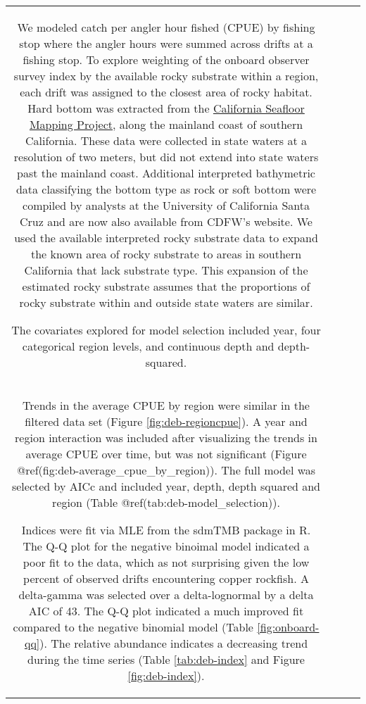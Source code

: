 \documentclass[11pt,
  letterpaper,
]{article}
\begin{document}
\begin{longtable}[t]{c>{\centering\arraybackslash}p{2cm}>{\centering\arraybackslash}p{2cm}>{\centering\arraybackslash}p{2cm}}
We modeled catch per angler hour fished (CPUE) by fishing stop where the angler hours were summed across drifts at a fishing stop. To explore weighting of the onboard observer survey index by the available rocky substrate within a region, each drift was assigned to the closest area of rocky habitat. Hard bottom was extracted from the \href{http://seafloor.otterlabs.org/index.html}{California Seafloor Mapping Project}, along the mainland coast of southern California. These data were collected in state waters at a resolution of two meters, but did not extend into state waters past the mainland coast. Additional interpreted bathymetric data classifying the bottom type as rock or soft bottom were compiled by analysts at the University of California Santa Cruz and are now also available from CDFW's website. We used the available interpreted rocky substrate data to expand the known area of rocky substrate to areas in southern California that lack substrate type. This expansion of the estimated rocky substrate assumes that the proportions of rocky substrate within and outside state waters are similar.

The covariates explored for model selection included year, four categorical region levels, and continuous depth and depth-squared.\\
Trends in the average CPUE by region were similar in the filtered data set (Figure \ref{fig:deb-regioncpue}). A year and region interaction was included after visualizing the trends in average CPUE over time, but was not significant (Figure @ref(fig:deb-average\_cpue\_by\_region)). The full model was selected by AICc and included year, depth, depth squared and region (Table @ref(tab:deb-model\_selection)).

Indices were fit via MLE from the sdmTMB package in R. The Q-Q plot for the negative binoimal model indicated a poor fit to the data, which as not surprising given the low percent of observed drifts encountering copper rockfish. A delta-gamma was selected over a delta-lognormal by a delta AIC of 43. The Q-Q plot indicated a much improved fit compared to the negative binomial model (Table \ref{fig:onboard-qq}). The relative abundance indicates a decreasing trend during the time series (Table \ref{tab:deb-index} and Figure \ref{fig:deb-index}).


\end{longtable}
\end{document}
